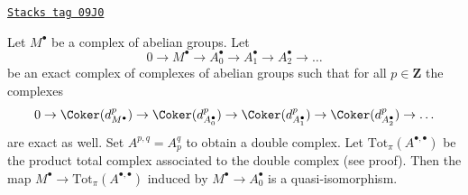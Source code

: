 \begin{lemma}
\label{homology-lemma-good-right-resolution-gives-qis}
\href{https://stacks.math.columbia.edu/tag/09J0}{\texttt{Stacks tag 09J0}}

Let $M^\bullet$ be a complex of abelian groups. Let
$$
0 \to M^\bullet \to A_0^\bullet \to A_1^\bullet \to A_2^\bullet \to \ldots
$$
be an exact complex of complexes of abelian groups
such that for all $p \in \mathbf{Z}$ the complexes
$$
0 \to
\Coker(d_{M^\bullet}^p) \to
\Coker(d_{A_0^\bullet}^p) \to
\Coker(d_{A_1^\bullet}^p) \to
\Coker(d_{A_2^\bullet}^p) \to \ldots
$$
are exact as well. Set $A^{p, q} = A_p^q$ to obtain a double
complex. Let $\text{Tot}_\pi(A^{\bullet, \bullet})$ be the
product total complex associated to the double complex
(see proof). Then the map
$M^\bullet \to \text{Tot}_\pi(A^{\bullet, \bullet})$
induced by $M^\bullet \to A_0^\bullet$ is a quasi-isomorphism.
\end{lemma}

